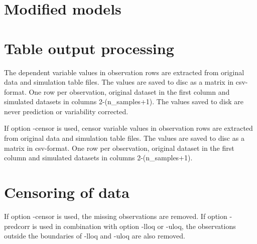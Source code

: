 \section{Modified models}

\section{Table output processing}
The dependent variable values in observation rows are extracted from original data and simulation table files. The values are saved to disc as a matrix in csv-format. One row per observation, original dataset in the first column and simulated datasets in columns 2-(n\_samples+1). The values saved to disk are never prediction or variability corrected.

If option -censor is used, censor variable values in observation rows are extracted from original data and simulation table files. The values are saved to disc as a matrix in csv-format. One row per observation, original dataset in the first column and simulated datasets in columns 2-(n\_samples+1).

\section{Censoring of data}
If option -censor is used, the missing observations are removed. If option -predcorr is used in combination with option -lloq or -uloq, the observations outside the boundaries of -lloq and -uloq are also removed.


